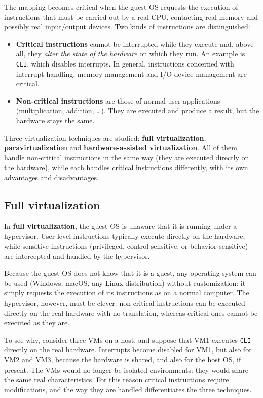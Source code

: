 The mapping becomes critical when the guest OS requests the execution of instructions that must be carried out by a real CPU, contacting real memory and possibly real input/output devices. Two kinds of instructions are distinguished:

\begin{itemize}
\item \textbf{Critical instructions} cannot be interrupted while they execute and, above all, they \emph{alter the state of the hardware} on which they run. An example is \texttt{CLI}, which disables interrupts. In general, instructions concerned with interrupt handling, memory management and I/O device management are critical.
\item \textbf{Non-critical instructions} are those of normal user applications (multiplication, addition, \dots). They are executed and produce a result, but the hardware stays the same.
\end{itemize}

Three virtualization techniques are studied: \textbf{full virtualization}, \textbf{paravirtualization} and \textbf{hardware-assisted virtualization}. All of them handle non-critical instructions in the same way (they are executed directly on the hardware), while each handles critical instructions differently, with its own advantages and disadvantages.

\subsection{Full virtualization}

In \textbf{full virtualization}, the guest OS is unaware that it is running under a hypervisor. User-level instructions typically execute directly on the hardware, while sensitive instructions (privileged, control-sensitive, or behavior-sensitive) are intercepted and handled by the hypervisor.

Because the guest OS does not know that it is a guest, any operating system can be used (Windows, macOS, any Linux distribution) without customization: it simply requests the execution of its instructions as on a normal computer. The hypervisor, however, must be clever: non-critical instructions can be executed directly on the real hardware with no translation, whereas critical ones cannot be executed as they are.

To see why, consider three VMs on a host, and suppose that VM1 executes \texttt{CLI} directly on the real hardware. Interrupts become disabled for VM1, but also for VM2 and VM3, because the hardware is shared, and also for the host OS, if present. The VMs would no longer be isolated environments: they would share the same real characteristics. For this reason critical instructions require modifications, and the way they are handled differentiates the three techniques.

